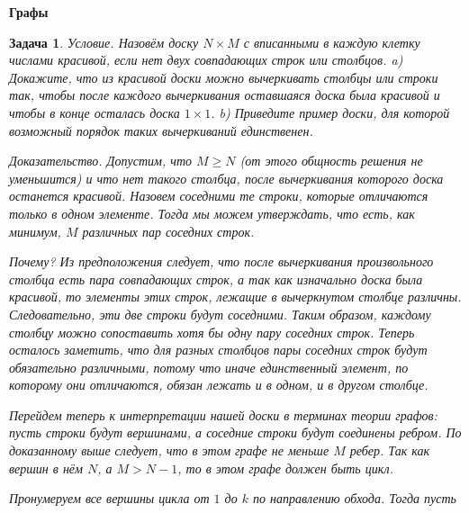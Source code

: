 \documentclass[12pt,a4paper,fleqn]{article}
\newtheorem{task}{Задача}
\begin{document}
\begin{center}
	\bf \Large Графы
\end{center}
\begin{task}
	\emph{Условие.} Назовём доску $N \times M$ с вписанными в каждую клетку числами \textit{красивой}, если нет двух совпадающих строк или столбцов. a) Докажите, что из красивой доски можно вычеркивать столбцы или строки так, чтобы после каждого вычеркивания оставшаяся доска была красивой и чтобы в конце осталась доска $1 \times 1$. b) Приведите пример доски, для которой возможный порядок таких вычеркиваний единственен.
	
	\emph{Доказательство.} Допустим, что $M \geqslant N$ (от этого общность решения не уменьшится) и что нет такого столбца, после вычеркивания которого доска останется красивой. Назовем \textit{соседними} те строки, которые отличаются только в одном элементе. Тогда мы можем утверждать, что есть, как минимум, $M$ различных пар соседних строк.
	
	Почему? Из предположения следует, что после вычеркивания произвольного столбца есть пара совпадающих строк, а так как изначально доска была красивой, то элементы этих строк, лежащие в вычеркнутом столбце различны. Следовательно, эти две строки будут соседними. Таким образом, каждому столбцу можно сопоставить хотя бы одну пару соседних строк. Теперь осталось заметить, что для разных столбцов пары соседних строк будут обязательно различными, потому что иначе единственный элемент, по которому они отличаются, обязан лежать и в одном, и в другом столбце.
	
	Перейдем теперь к интерпретации нашей доски в терминах теории графов: пусть строки будут вершинами, а соседние строки будут соединены ребром. По доказанному выше следует, что в этом графе не меньше $M$ ребер. Так как вершин в нём $N$, а $M > N - 1$, то в этом графе должен быть цикл. 
	
	Пронумеруем все вершины цикла от $1$ до $k$ по направлению обхода. Тогда пусть 
\end{task}
\end{document}
